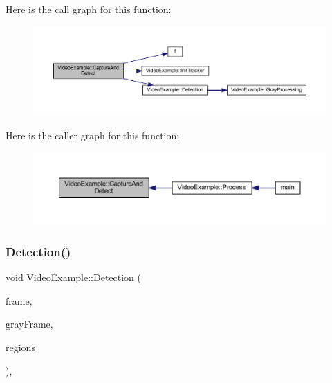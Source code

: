 Here is the call graph for this function\+:\nopagebreak
\begin{figure}[H]
\begin{center}
\leavevmode
\includegraphics[width=350pt]{class_video_example_ace8617201da40b6e230bd6c049b48aa0_cgraph}
\end{center}
\end{figure}
Here is the caller graph for this function\+:\nopagebreak
\begin{figure}[H]
\begin{center}
\leavevmode
\includegraphics[width=350pt]{class_video_example_ace8617201da40b6e230bd6c049b48aa0_icgraph}
\end{center}
\end{figure}
\mbox{\label{class_video_example_a5ea4a212997371399b01aed1d59a80b8}} 
\subsubsection{\texorpdfstring{Detection()}{Detection()}}
{\footnotesize\ttfamily void Video\+Example\+::\+Detection (\begin{DoxyParamCaption}\item[{cv\+::\+Mat}]{frame,  }\item[{cv\+::\+U\+Mat}]{gray\+Frame,  }\item[{\mbox{\hyperlink{defines_8h_a01db0de56a20f4342820a093c5154536}{regions\+\_\+t}} \&}]{regions }\end{DoxyParamCaption})\hspace{0.3cm}{\ttfamily [protected]}, {\ttfamily [inherited]}}



